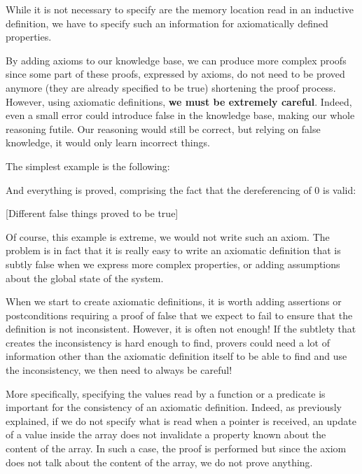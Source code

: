 While it is not necessary to specify are the memory location read in an
inductive definition, we have to specify such an information for axiomatically
defined properties.




By adding axioms to our knowledge base, we can produce more complex
proofs since some part of these proofs, expressed by axioms, do not need
to be proved anymore (they are already specified to be true) shortening
the proof process. However, using axiomatic definitions, \textbf{we must
be extremely careful}. Indeed, even a small error could introduce false
in the knowledge base, making our whole reasoning futile. Our reasoning
would still be correct, but relying on false knowledge, it would only
learn incorrect things.



The simplest example is the following:






And everything is proved, comprising the fact that the dereferencing of
0 is valid:



[Different false things proved to be true]


Of course, this example is extreme, we would not write such an axiom.
The problem is in fact that it is really easy to write an axiomatic
definition that is subtly false when we express more complex properties,
or adding assumptions about the global state of the system.







When we start to create axiomatic definitions, it is worth adding
assertions or postconditions requiring a proof of false that we expect
to fail to ensure that the definition is not inconsistent. However, it
is often not enough! If the subtlety that creates the inconsistency is
hard enough to find, provers could need a lot of information other than
the axiomatic definition itself to be able to find and use the
inconsistency, we then need to always be careful!




More specifically, specifying the values read by a function or a
predicate is important for the consistency of an axiomatic definition.
Indeed, as previously explained, if we do not specify what is read when
a pointer is received, an update of a value inside the array does not
invalidate a property known about the content of the array. In such a
case, the proof is performed but since the axiom does not talk about the
content of the array, we do not prove anything.




